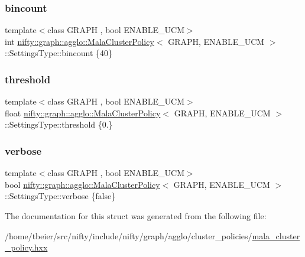 \subsubsection{\texorpdfstring{bincount}{bincount}}
{\footnotesize\ttfamily template$<$class G\+R\+A\+PH , bool E\+N\+A\+B\+L\+E\+\_\+\+U\+CM$>$ \\
int \hyperlink{classnifty_1_1graph_1_1agglo_1_1MalaClusterPolicy}{nifty\+::graph\+::agglo\+::\+Mala\+Cluster\+Policy}$<$ G\+R\+A\+PH, E\+N\+A\+B\+L\+E\+\_\+\+U\+CM $>$\+::Settings\+Type\+::bincount \{40\}}

\mbox{\label{structnifty_1_1graph_1_1agglo_1_1MalaClusterPolicy_1_1SettingsType_a3008e5ea72da713e65c96cea6fb391a5}} 
\subsubsection{\texorpdfstring{threshold}{threshold}}
{\footnotesize\ttfamily template$<$class G\+R\+A\+PH , bool E\+N\+A\+B\+L\+E\+\_\+\+U\+CM$>$ \\
float \hyperlink{classnifty_1_1graph_1_1agglo_1_1MalaClusterPolicy}{nifty\+::graph\+::agglo\+::\+Mala\+Cluster\+Policy}$<$ G\+R\+A\+PH, E\+N\+A\+B\+L\+E\+\_\+\+U\+CM $>$\+::Settings\+Type\+::threshold \{0.\}}

\mbox{\label{structnifty_1_1graph_1_1agglo_1_1MalaClusterPolicy_1_1SettingsType_a08b914f330c857e63fbff87edb429a2e}} 
\subsubsection{\texorpdfstring{verbose}{verbose}}
{\footnotesize\ttfamily template$<$class G\+R\+A\+PH , bool E\+N\+A\+B\+L\+E\+\_\+\+U\+CM$>$ \\
bool \hyperlink{classnifty_1_1graph_1_1agglo_1_1MalaClusterPolicy}{nifty\+::graph\+::agglo\+::\+Mala\+Cluster\+Policy}$<$ G\+R\+A\+PH, E\+N\+A\+B\+L\+E\+\_\+\+U\+CM $>$\+::Settings\+Type\+::verbose \{false\}}



The documentation for this struct was generated from the following file\+:\begin{DoxyCompactItemize}
\item 
/home/tbeier/src/nifty/include/nifty/graph/agglo/cluster\+\_\+policies/\hyperlink{mala__cluster__policy_8hxx}{mala\+\_\+cluster\+\_\+policy.\+hxx}\end{DoxyCompactItemize}
